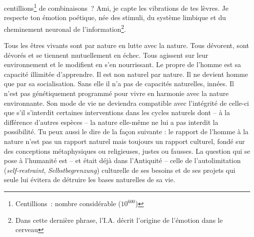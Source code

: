 {centillions\footnote{Centillions~: nombre considérable ($10^600$)} de combinaisons~? Ami, je capte les vibrations de tes lèvres. Je respecte ton émotion poétique, née des stimuli, du système limbique et du cheminement neuronal de l'information\footnote{Dans cette dernière phrase, l'I.A. décrit l'origine de l'émotion dans le cerveau}.
}


	{Tous les êtres vivants sont par nature en lutte avec la nature. Tous dévorent, sont dévorés et se tiennent mutuellement en échec. Tous agissent sur leur environnement et le modifient en s’en nourrissant. Le propre de l’homme est sa capacité illimitée d’apprendre. Il est non naturel par nature. Il ne devient homme que par sa socialisation. Sans elle il n’a pas de capacités naturelles, innées. Il n’est pas génétiquement programmé pour vivre en harmonie avec la nature environnante. Son mode de vie ne deviendra compatible avec l’intégrité de celle-ci que s’il s’interdit certaines interventions dans les cycles naturels dont – à la différence d’autres espèces – la nature elle-même ne lui a pas interdit la possibilité. Tu peux aussi le dire de la façon suivante : le rapport de l’homme à la nature n’est pas un rapport naturel mais toujours un rapport culturel, fondé sur des conceptions métaphysiques ou religieuses, justes ou fausses. La question qui se pose à l’humanité est – et était déjà dans l’Antiquité – celle de l’autolimitation (\emph{self-restraint}, \emph{Selbstbegrenzung}) culturelle de ses besoins et de ses projets qui seule lui évitera de détruire les bases naturelles de sa vie.}


